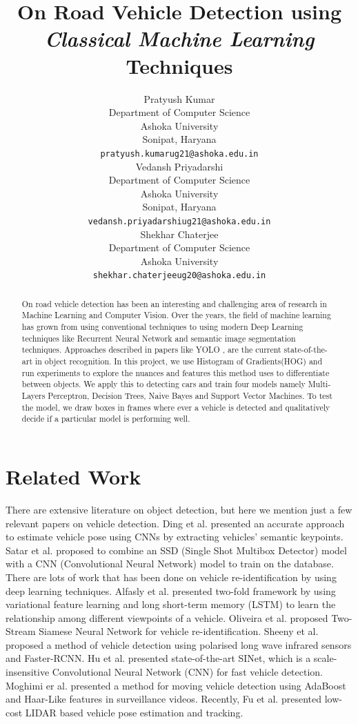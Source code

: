 \documentclass{article}
\title{On Road Vehicle Detection using \emph{Classical Machine Learning} Techniques}
\author{
  Pratyush Kumar \\
  Department of Computer Science\\
  Ashoka University\\
  Sonipat, Haryana \\
  \texttt{pratyush.kumar\textunderscore ug21@ashoka.edu.in} \\
   \And
 Vedansh Priyadarshi \\
  Department of Computer Science\\
  Ashoka University\\
  Sonipat, Haryana \\
  \texttt{vedansh.priyadarshi\textunderscore ug21@ashoka.edu.in} \\
 \AND
  Shekhar Chaterjee \\
  Department of Computer Science \\
  Ashoka University \\
  \texttt{shekhar.chaterjee\textunderscore ug20@ashoka.edu.in} \\
}
\begin{document}
\maketitle
\begin{abstract}
On road vehicle detection has been an interesting and challenging area of research in Machine Learning and Computer Vision. Over the years, the field of machine learning has grown from using conventional techniques to using modern Deep Learning techniques like Recurrent Neural Network\cite{1808-03314} and semantic image segmentation\cite{1412.7062} techniques. Approaches described in papers like YOLO \cite{1506.02640}, are the current state-of-the-art in object recognition. In this project, we use Histogram of Gradients(HOG)\cite{1501.02058} and run experiments to explore the nuances and features this method uses to differentiate between objects. We apply this to detecting cars and train four models namely Multi-Layers Perceptron\cite{1412.5513}, Decision Trees\cite{1305.4537}, Naive Bayes\cite{1302.5189} and Support Vector Machines\cite{1506.02509}. To test the model, we draw boxes in frames where ever a vehicle is detected and qualitatively decide if a particular model is performing well. 
\end{abstract}




\section{Related Work}
There are extensive literature on object detection, but here we mention just a few relevant papers on vehicle detection. Ding et al.\cite{1802.03515} presented an accurate approach to estimate vehicle pose using CNNs by extracting vehicles’ semantic keypoints. Satar et al.\cite{1809.00953} proposed to combine an SSD (Single Shot Multibox Detector) model with a CNN (Convolutional Neural Network) model to train on the database. There are lots of work that has been done on vehicle re-identification by using deep learning techniques. Alfasly et al.\cite{1905.02343} presented two-fold framework by using variational feature learning and long short-term memory (LSTM) to learn the relationship among different viewpoints of a vehicle. Oliveira et al.\cite{1911.05541} proposed Two-Stream Siamese Neural Network for vehicle re-identification. Sheeny et al.\cite{1804.02576} proposed a method of vehicle detection using polarised long wave infrared sensors and Faster-RCNN. Hu et al.\cite{1804.00433} presented state-of-the-art SINet, which is a scale-insensitive Convolutional Neural Network (CNN) for fast vehicle detection. Moghimi er al.\cite{1801.01698} presented a method for moving vehicle detection using AdaBoost and Haar-Like features in surveillance videos. Recently, Fu et al.\cite{1910.01701} presented low-cost LIDAR based vehicle pose estimation and tracking.
\end{document}
